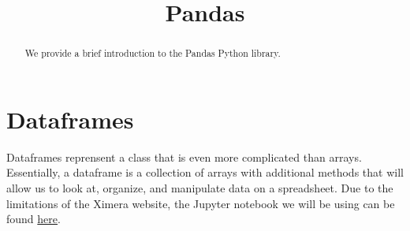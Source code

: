 \documentclass{ximera}
\title{Pandas}
\begin{document}
\begin{abstract}
	We provide a brief introduction to the Pandas Python library.
\end{abstract}
\maketitle

\section{Dataframes}

Dataframes reprensent a class that is even more complicated than arrays.
Essentially, a dataframe is a collection of arrays with additional methods
that will allow us to look at, organize, and manipulate data on a spreadsheet.
Due to the limitations of the Ximera website, the Jupyter notebook we will
be using can be found \href{https://colab.research.google.com/drive/16JH90ktosyA_SPWT-xH6zZVnfysOhNpd?usp=sharing}{here}. 
\end{document}

